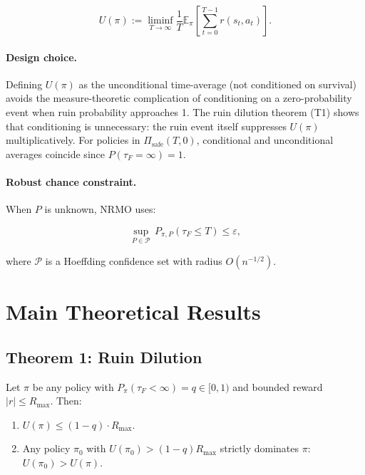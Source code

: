 \begin{definition}
\label{def:arxiv-objective}
\begin{equation}
U(\pi) := \liminf_{T \to \infty}
\frac{1}{T} \mathbb{E}_\pi\!\left[
\sum_{t=0}^{T-1} r(s_t, a_t)
\right].
\end{equation}
\end{definition}

\paragraph{Design choice.}
Defining $U(\pi)$ as the unconditional time-average (not conditioned
on survival) avoids the measure-theoretic complication of
conditioning on a zero-probability event when ruin probability
approaches 1. The ruin dilution theorem (T1) shows that conditioning
is unnecessary: the ruin event itself suppresses $U(\pi)$
multiplicatively. For policies in $\Pi_{\mathrm{safe}}(T, 0)$,
conditional and unconditional averages coincide since
$P(\tau_F = \infty) = 1$.

\paragraph{Robust chance constraint.}
When $P$ is unknown, NRMO uses:

\begin{equation}
\sup_{P \in \mathcal{P}}\,
P_{\pi, P}(\tau_F \le T) \le \varepsilon,
\end{equation}

where $\mathcal{P}$ is a Hoeffding confidence set with radius
$O(n^{-1/2})$.

\section{Main Theoretical Results}
\label{sec:arxiv-main-results}

\subsection{Theorem 1: Ruin Dilution}
\label{sec:arxiv-thm-1}

\begin{theorem}
\label{thm:arxiv-ruin-dilution}
Let $\pi$ be any policy with $P_\pi(\tau_F < \infty) = q \in [0, 1)$
and bounded reward $|r| \le R_{\max}$. Then:
\begin{enumerate}
\item[(i)] $U(\pi) \le (1 - q) \cdot R_{\max}$.
\item[(ii)] Any policy $\pi_0$ with $U(\pi_0) > (1 - q) R_{\max}$
strictly dominates $\pi$: $U(\pi_0) > U(\pi)$.
\end{enumerate}
\end{theorem}

